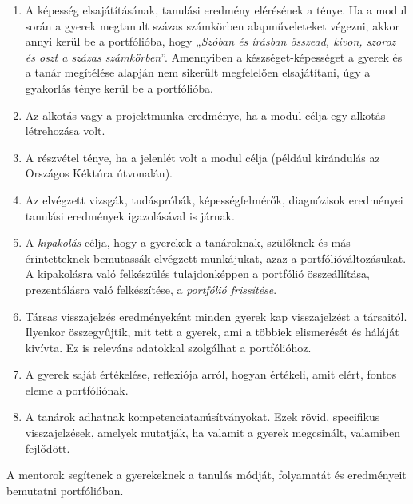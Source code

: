 \begin{enumerate}
\def\labelenumi{\arabic{enumi}.}
\tightlist
\item
  A képesség elsajátításának, tanulási eredmény elérésének a ténye. Ha a
  modul során a gyerek megtanult százas számkörben alapműveleteket
  végezni, akkor annyi kerül be a portfólióba, hogy „\emph{Szóban és
  írásban összead, kivon, szoroz és oszt a százas számkörben}''.
  Amennyiben a készséget-képességet a gyerek és a tanár megítélése
  alapján nem sikerült megfelelően elsajátítani, úgy a gyakorlás ténye
  kerül be a portfólióba.
\item
  Az alkotás vagy a projektmunka eredménye, ha a modul célja egy alkotás
  létrehozása volt.
\item
  A részvétel ténye, ha a jelenlét volt a modul célja (például
  kirándulás az Országos Kéktúra útvonalán).
\item
  Az elvégzett vizsgák, tudáspróbák, képességfelmérők, diagnózisok
  eredményei tanulási eredmények igazolásával is járnak.
\item
  A \emph{kipakolás} célja, hogy a gyerekek a tanároknak, szülőknek és
  más érintetteknek bemutassák elvégzett munkájukat, azaz a
  portfólióváltozásukat. A kipakolásra való felkészülés tulajdonképpen a
  portfólió összeállítása, prezentálásra való felkészítése, a
  \emph{portfólió frissítése}.
\item
  Társas visszajelzés eredményeként minden gyerek kap visszajelzést a
  társaitól. Ilyenkor összegyűjtik, mit tett a gyerek, ami a többiek
  elismerését és háláját kivívta. Ez is releváns adatokkal szolgálhat a
  portfólióhoz.
\item
  A gyerek saját értékelése, reflexiója arról, hogyan értékeli, amit
  elért, fontos eleme a portfóliónak.
\item
  A tanárok adhatnak kompetenciatanúsítványokat. Ezek rövid, specifikus
  visszajelzések, amelyek mutatják, ha valamit a gyerek megcsinált,
  valamiben fejlődött.
\end{enumerate}

A mentorok segítenek a gyerekeknek a tanulás módját, folyamatát és
eredményeit bemutatni portfólióban.

